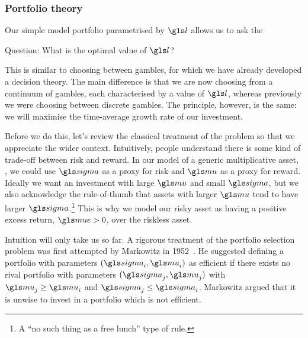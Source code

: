 \subsubsection{Portfolio theory}
Our simple model portfolio parametrised by $\l$ allows us to ask the
\begin{keypts}{Question:}
What is the optimal value of $\l$?
\end{keypts}
This is similar to choosing between gambles, for which we have already developed a decision theory. The main difference is that we are now choosing from a continuum of gambles, each characterised by a value of $\l$, whereas previously we were choosing between discrete gambles. The principle, however, is the same: we will maximise the time-average growth rate of our investment.

Before we do this, let's review the classical treatment of the problem so that we appreciate the wider context. Intuitively, people understand there is some kind of trade-off between risk and reward. In our model of a generic multiplicative asset, , we could use $\gsigma$ as a proxy for risk and $\gmu$ as a proxy for reward. Ideally we want an investment with large $\gmu$ and small $\gsigma$, but we also acknowledge the rule-of-thumb that assets with larger $\gmu$ tend to have larger $\gsigma$.\footnote{A ``no such thing as a free lunch'' type of rule.} This is why we model our risky asset as having a positive excess return, $\mue>0$, over the riskless asset.

Intuition will only take us so far. A rigorous treatment of the portfolio selection problem was first attempted by Markowitz in 1952~\cite{Markowitz1952}. He suggested defining a portfolio with parameters $(\gsigma_i, \gmu_i)$ as efficient if there exists no rival portfolio with parameters $(\gsigma_j, \gmu_j)$ with $\gmu_j\geq\gmu_i$ and $\gsigma_j\leq\gsigma_i$.
Markowitz argued that it is unwise to invest in a portfolio which is not efficient.

